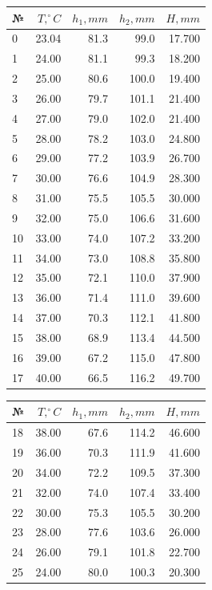 \documentclass[a4paper, 12pt]{article}
\begin{document}
    \begin{table}[h!]
        \vspace{5pt}
        \begin{center}
        \subtable
        {
            \begin{tabular}{|l|rrr|r|}
            \hline
            № &    $T, ^\circ C$ &    $h_1, mm$ &  $h_2, mm$ & $H, mm$ \\
            \hline
            0 &   23.04   &81.3 &   99.0& 17.700\\
            1  &  24.00  & 81.1  &  99.3&18.200\\
            2   & 25.00   &80.6   & 100.0&19.400\\
            3  &  26.00  & 79.7    &101.1&21.400\\
            4  & 27.00  & 79.0 &   102.0&21.400\\
            5   & 28.00 &  78.2 &   103.0&24.800\\
            6  &  29.00   &77.2  &  103.9&26.700\\
            7  &  30.00  & 76.6   & 104.9&28.300\\
            8  &  31.00  & 75.5    &105.5&30.000\\
            9  &  32.00  & 75.0&    106.6&31.600\\
            10 &  33.00  & 74.0 &   107.2&33.200\\
            11 &  34.00  & 73.0  &  108.8&35.800\\
            12 &  35.00   &72.1   & 110.0&37.900\\
            13  & 36.00  & 71.4    &111.0&39.600\\
            14  & 37.00  & 70.3&    112.1&41.800\\
            15  & 38.00  & 68.9 &   113.4&44.500\\
            16  & 39.00  & 67.2  &  115.0&47.800\\
            17  & 40.00 &  66.5   & 116.2&49.700\\
            \hline
            \end{tabular}
        }
        \subtable
        {
            \begin{tabular}{|l|rrr|r|}
            \hline
            № &    $T, ^\circ C$ &    $h_1, mm$ &  $h_2, mm$ & $H, mm$ \\
            \hline
            18 &  38.00 &  67.6  &  114.2 &  46.600   \\
            19 &  36.00 &   70.3 &  111.9 &    41.600 \\
            20 &  34.00 &  72.2 &  109.5 &    37.300  \\
            21 &  32.00 &  74.0  &   107.4 &    33.400\\
            22 &  30.00 & 75.3   &  105.5  &  30.200  \\
            23 &  28.00 &  77.6  &  103.6 &   26.000  \\
            24 &  26.00 &   79.1 & 101.8  &    	22.700 \\
            25 &  24.00 &  80.0 &  100.3 &    20.300 \\
            \hline
            \end{tabular}
        }


\end{center}
\end{table}
\end{document}
